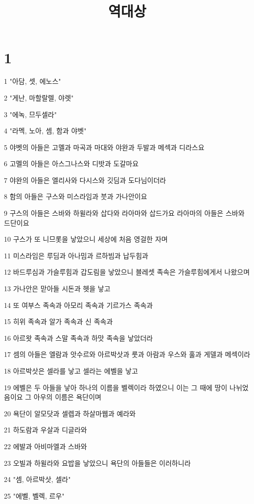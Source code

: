 

\title{역대상}


\chapter{1}

\par 1 "아담, 셋, 에노스"
\par 2 "게난, 마할랄렐, 야렛"
\par 3 "에녹, 므두셀라"
\par 4 "라멕, 노아, 셈, 함과 야벳"
\par 5 야벳의 아들은 고멜과 마곡과 마대와 야완과 두발과 메섹과 디라스요
\par 6 고멜의 아들은 아스그나스와 디밧과 도갈마요
\par 7 야완의 아들은 엘리사와 다시스와 깃딤과 도다님이더라
\par 8 함의 아들은 구스와 미스라임과 붓과 가나안이요
\par 9 구스의 아들은 스바와 하윌라와 삽다와 라아마와 삽드가요 라아마의 아들은 스바와 드단이요
\par 10 구스가 또 니므롯을 낳았으니 세상에 처음 영걸한 자며
\par 11 미스라임은 루딤과 아나밈과 르하빔과 납두힘과
\par 12 바드루심과 가슬루힘과 갑도림을 낳았으니 블레셋 족속은 가슬루힘에게서 나왔으며
\par 13 가나안은 맏아들 시돈과 헷을 낳고
\par 14 또 여부스 족속과 아모리 족속과 기르가스 족속과
\par 15 히위 족속과 알가 족속과 신 족속과
\par 16 아르왓 족속과 스말 족속과 하맛 족속을 낳았더라
\par 17 셈의 아들은 엘람과 앗수르와 아르박삿과 룻과 아람과 우스와 훌과 게델과 메섹이라
\par 18 아르박삿은 셀라를 낳고 셀라는 에벨을 낳고
\par 19 에벨은 두 아들을 낳아 하나의 이름을 벨렉이라 하였으니 이는 그 때에 땅이 나뉘었음이요 그 아우의 이름은 욕단이며
\par 20 욕단이 알모닷과 셀렙과 하살마웹과 예라와
\par 21 하도람과 우살과 디글라와
\par 22 에발과 아비마엘과 스바와
\par 23 오빌과 하윌라와 요밥을 낳았으니 욕단의 아들들은 이러하니라
\par 24 "셈, 아르박삿, 셀라"
\par 25 "에벨, 벨렉, 르우"
